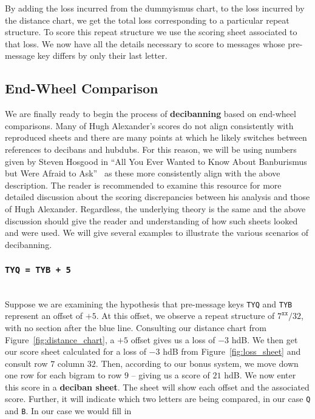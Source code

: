 \noindent By adding the loss incurred from the dummyismus chart, to
the loss incurred by the distance chart, we get the total loss
corresponding to a particular repeat structure. To score this repeat
structure we use the scoring sheet associated to that loss. We now
have all the details necessary to score to
messages whose pre-message key differs by only their last letter.

\subsection{End-Wheel Comparison}
We are finally ready to begin the process of {\bf{decibanning}}
based on end-wheel comparisons. Many of Hugh Alexander's scores do
not align consistently with reproduced sheets and there are many
points at which he likely switches between references to decibans
and hubdubs. For this reason, we will be using numbers given by
Steven Hosgood in ``All You Ever Wanted to Know About
Banburismus but Were Afraid to Ask''~\cite{Hosgood2007} as these more consistently align
with the above description. The reader is recommended to examine
this resource for more detailed discussion about the scoring
discrepancies between his analysis and those of Hugh Alexander.
Regardless, the underlying theory is the same and the above
discussion should give the reader and understanding of how such
sheets looked and were used. We will give several examples to
illustrate the various scenarios of decibanning.
\subsubsection{\texttt{TYQ = TYB + 5}}
\text{}\\Suppose we are examining the hypothesis that pre-message
keys \texttt{TYQ} and \texttt{TYB} represent an offset of $+5$. At
this offset, we observe a repeat structure of $7^\texttt{xx}/32$,
with no section after the blue line. Consulting our distance chart
from Figure~\ref{fig:distance_chart}, a $+5$ offset gives us a loss
of $-3$ hdB. We then get our score sheet calculated for a loss of
$-3$ hdB from Figure~\ref{fig:loss_sheet} and consult row $7$
column $32$. Then, according to our bonus system, we move down one
row for each bigram to row $9$ -- giving us a score of $21$ hdB. We
now enter this score in a  {\bf{deciban sheet}}. The sheet will
show each offset and the associated score. Further, it will
indicate which two letters are being compared, in our case
\texttt{Q} and \texttt{B}. In our case we would fill in

